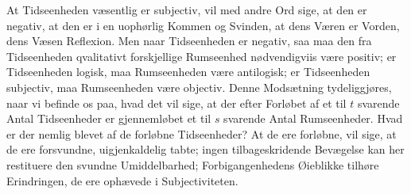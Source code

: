 \documentclass[12pt]{book}
\newcommand{\opage}[1]{\marginnote{\footnotesize\textit{[#1]}}}
\begin{document}
At Tidseenheden væsentlig er subjectiv, vil med andre Ord sige, at den er negativ, at den
er i en uophørlig Kommen og Svinden, at dens Væren er Vorden, dens Væsen
\opage{347} Reflexion. Men naar Tidseenheden er negativ, saa maa den fra Tidseenheden qvalitativt
forskjellige Rumseenhed nødvendigviis være positiv; er Tidseenheden logisk, maa
Rumseenheden være antilogisk; er Tidseenheden subjectiv, maa Rumseenheden være objectiv.
Denne Modsætning tydeliggjøres, naar vi befinde os paa, hvad det vil sige, at der efter
Forløbet af et til $t$ svarende Antal Tidseenheder er gjennemløbet et til $s$ svarende
Antal Rumseenheder. Hvad er der nemlig blevet af de forløbne Tidseenheder? At de ere
forløbne, vil sige, at de ere forsvundne, uigjenkaldelig tabte; ingen tilbageskridende
Bevægelse kan her restituere den svundne Umiddelbarhed; Forbigangenhedens Øieblikke
tilhøre Erindringen, de ere ophævede i Subjectiviteten.
\end{document}
